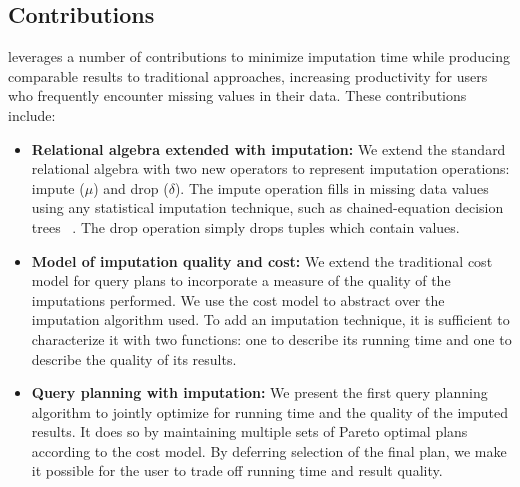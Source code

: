 \subsection{Contributions}
\ProjectName{} leverages a number of contributions to minimize imputation time while producing comparable results to traditional approaches,
increasing productivity for users who frequently encounter missing values in their data. These contributions include:
\begin{itemize}
\item \textbf{Relational algebra extended with imputation:}
  We extend the standard relational algebra with two new operators to represent imputation operations: impute ($\mu$) and drop ($\delta$).
  The impute operation fills in missing data values using any statistical imputation
  technique, such as chained-equation decision trees ~\cite{burgette2010multiple}.
  The drop operation simply drops tuples which contain \nullv{} values.
\item \textbf{Model of imputation quality and cost:}
  We extend the traditional cost model for query plans to incorporate a measure of the quality of the imputations performed.
  We use the cost model to abstract over the imputation algorithm used.
  To add an imputation technique, it is sufficient to characterize it with two functions: one to describe its running time and one to describe the quality of its results.
\item \textbf{Query planning with imputation:}
  We present the first query planning algorithm to jointly optimize for running time and the quality of the imputed results.
  It does so by maintaining multiple sets of Pareto optimal plans according to the cost model.
  By deferring selection of the final plan, we make it possible for the user to trade off running time and result quality.
\end{itemize}




